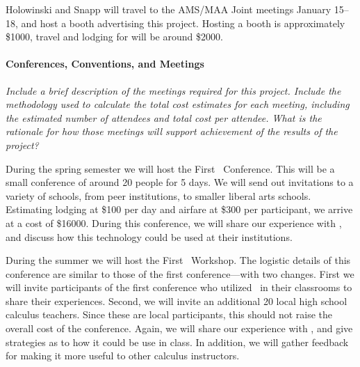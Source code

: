 \vspace{\topsep}

Holowinski and Snapp will travel to the AMS/MAA Joint meetings January
15--18, and host a booth advertising this project.  Hosting a booth is
approximately \$1000, travel and lodging for will be around \$2000.


\paragraph{Conferences, Conventions, and Meetings}
\textsl{Include a brief description of the meetings required for this
  project. Include the methodology used to calculate the total cost
  estimates for each meeting, including the estimated number of
  attendees and total cost per attendee. What is the rationale for how
  those meetings will support achievement of the results of the
  project?}

\vspace{\topsep}

During the spring semester we will host the First
\mooculus\ Conference. This will be a small conference of around 20
people for 5 days. We will send out invitations to a variety of
schools, from peer institutions, to smaller liberal arts
schools. Estimating lodging at \$100 per day and airfare at \$300 per
participant, we arrive at a cost of \$16000. During this conference,
we will share our experience with \mooculus, and discuss how this
technology could be used at their institutions.

During the summer we will host the First \mooculus\ Workshop. The
logistic details of this conference are similar to those of the first
conference---with two changes. First we will invite participants of
the first conference who utilized \mooculus\ in their classrooms to
share their experiences. Second, we will invite an additional 20 local
high school calculus teachers. Since these are local participants,
this should not raise the overall cost of the conference. Again, we
will share our experience with \mooculus, and give strategies as to
how it could be use in class. In addition, we will gather feedback for
making it more useful to other calculus instructors.
